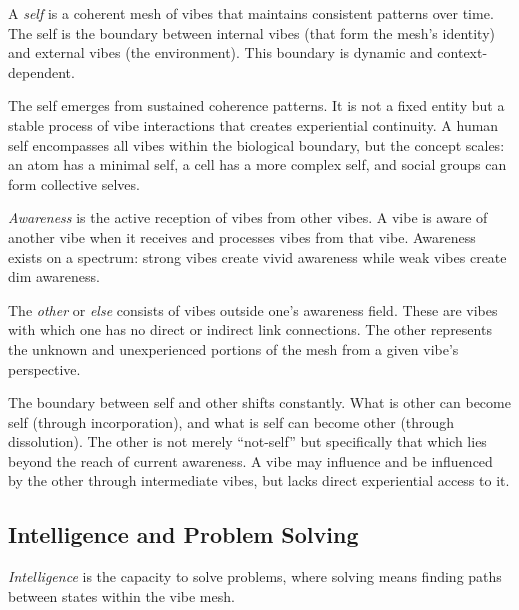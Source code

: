 \begin{definition}[Self]
A \emph{self} is a coherent mesh of vibes that maintains consistent patterns over time. The self is the boundary between internal vibes (that form the mesh's identity) and external vibes (the environment). This boundary is dynamic and context-dependent.
\end{definition}

The self emerges from sustained coherence patterns. It is not a fixed entity but a stable process of vibe interactions that creates experiential continuity. A human self encompasses all vibes within the biological boundary, but the concept scales: an atom has a minimal self, a cell has a more complex self, and social groups can form collective selves.

\begin{definition}[Awareness]
\emph{Awareness} is the active reception of vibes from other vibes. A vibe is aware of another vibe when it receives and processes vibes from that vibe. Awareness exists on a spectrum: strong vibes create vivid awareness while weak vibes create dim awareness.
\end{definition}

\begin{definition}
The \emph{other} or \emph{else} consists of vibes outside one's awareness field. These are vibes with which one has no direct or indirect link connections. The other represents the unknown and unexperienced portions of the mesh from a given vibe's perspective.
\end{definition}

The boundary between self and other shifts constantly. What is other can become self (through incorporation), and what is self can become other (through dissolution). The other is not merely ``not-self'' but specifically that which lies beyond the reach of current awareness. A vibe may influence and be influenced by the other through intermediate vibes, but lacks direct experiential access to it.

\subsection{Intelligence and Problem Solving}

\begin{definition}[Intelligence]
\emph{Intelligence} is the capacity to solve problems, where solving means finding paths between states within the vibe mesh.
\end{definition}

